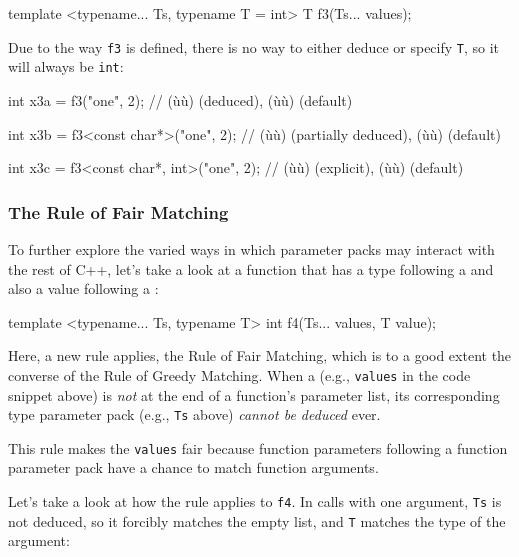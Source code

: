 \begin{emcppslisting}
template <typename... Ts, typename T = int>
T f3(Ts... values);
\end{emcppslisting}
    

\noindent Due to the way \lstinline!f3! is defined, there is no way to either deduce
or specify \lstinline!T!, so it will always be \lstinline!int!:

\begin{emcppslisting}
int x3a = f3("one", 2);
    // (ù{}ù) (deduced), (ù{}ù) (default)

int x3b = f3<const char*>("one", 2);
    // (ù{}ù) (partially deduced), (ù{}ù) (default)

int x3c = f3<const char*, int>("one", 2);
    // (ù{}ù) (explicit), (ù{}ù) (default)
\end{emcppslisting}
    

\subsubsection[The Rule of Fair Matching]{The Rule of Fair Matching}\label{the-rule-of-fair-matching}

To further explore the varied ways in which parameter packs may interact
with the rest of C++, let's take a look at a function that has a type
following a  and also a value following
a :

\begin{emcppslisting}
template <typename... Ts, typename T>
int f4(Ts... values, T value);
\end{emcppslisting}
    

\noindent Here, a new rule applies, the Rule of Fair Matching, which is to a good
extent the converse of the Rule of Greedy Matching. When a
 (e.g., \lstinline!values! in the code
snippet above) is \emph{not} at the end of a function's parameter list,
its corresponding type parameter pack (e.g., \lstinline!Ts! above)
\emph{cannot be deduced} ever.

This rule makes the  \lstinline!values!
fair because function parameters following a function parameter pack
have a chance to match function arguments.

Let's take a look at how the rule applies to \lstinline!f4!. In calls with
one argument, \lstinline!Ts! is not deduced, so it forcibly matches the
empty list, and \lstinline!T! matches the type of the argument:

